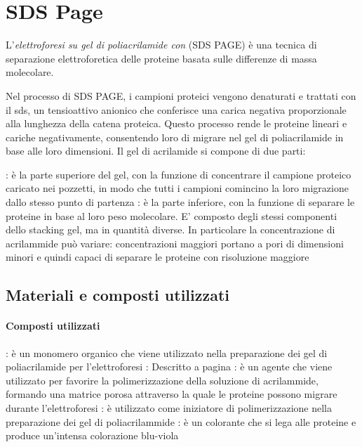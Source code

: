 \section{SDS Page}
L'\textit{elettroforesi su gel di poliacrilamide con } (SDS PAGE) è una tecnica di separazione elettroforetica delle proteine basata sulle differenze di massa molecolare.

Nel processo di SDS PAGE, i campioni proteici vengono denaturati e trattati con il \gls{sds}, un tensioattivo anionico che conferisce una carica negativa proporzionale alla lunghezza della catena proteica. Questo processo rende le proteine lineari e cariche negativamente, consentendo loro di migrare nel gel di poliacrilamide in base alle loro dimensioni. Il gel di acrilamide si compone di due parti:
\begin{itemize}
	: è la parte superiore del gel, con la funzione di concentrare il campione proteico	caricato nei pozzetti, in modo che tutti i campioni comincino la loro migrazione dallo stesso punto di partenza
	: è la parte inferiore, con la funzione di separare le proteine in base al loro peso	molecolare. E’ composto degli stessi componenti dello stacking gel, ma in quantità diverse. In particolare la concentrazione di acrilammide può variare: concentrazioni maggiori portano a pori di dimensioni minori e quindi capaci di separare le proteine con risoluzione maggiore
\end{itemize}


\subsection{Materiali e composti utilizzati}
\paragraph{Composti utilizzati}
\begin{itemize}
	\itemb[Acrilammide]: è un monomero organico che viene utilizzato nella preparazione dei gel di poliacrilamide per l'elettroforesi
	: Descritto a pagina \pageref{it:compostiUtilizzatiRel8}
	: è un agente che viene utilizzato per favorire la polimerizzazione della soluzione di acrilammide, formando una matrice porosa attraverso la quale le proteine possono migrare durante l'elettroforesi
	: è utilizzato come iniziatore di polimerizzazione nella preparazione dei gel di poliacrilammide
	: è un colorante che si lega alle proteine e produce un'intensa colorazione blu-viola
\end{itemize}


